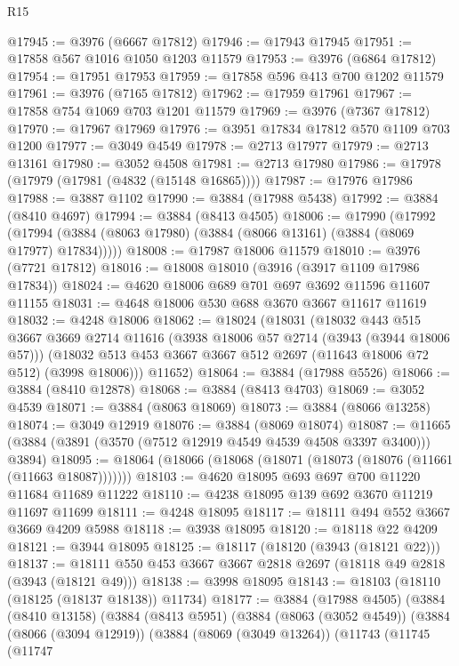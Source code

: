 \begin{lexlean}{R15}
\begin{coremodule}
@17945 := @3976 (@6667 @17812)
@17946 := @17943 @17945
@17951 := @17858 @567 @1016 @1050 @1203 @11579
@17953 := @3976 (@6864 @17812)
@17954 := @17951 @17953
@17959 := @17858 @596 @413 @700 @1202 @11579
@17961 := @3976 (@7165 @17812)
@17962 := @17959 @17961
@17967 := @17858 @754 @1069 @703 @1201 @11579
@17969 := @3976 (@7367 @17812)
@17970 := @17967 @17969
@17976 := @3951 @17834 @17812 @570 @1109 @703 @1200
@17977 := @3049 @4549
@17978 := @2713 @17977
@17979 := @2713 @13161
@17980 := @3052 @4508
@17981 := @2713 @17980
@17986 := @17978 (@17979 (@17981 (@4832 (@15148 @16865))))
@17987 := @17976 @17986
@17988 := @3887 @1102
@17990 := @3884 (@17988 @5438)
@17992 := @3884 (@8410 @4697)
@17994 := @3884 (@8413 @4505)
@18006 := @17990
    (@17992 (@17994 (@3884 (@8063 @17980) (@3884 (@8066 @13161) (@3884 (@8069 @17977) @17834)))))
@18008 := @17987 @18006 @11579
@18010 := @3976 (@7721 @17812)
@18016 := @18008 @18010 (@3916 (@3917 @1109 @17986 @17834))
@18024 := @4620 @18006 @689 @701 @697 @3692 @11596 @11607 @11155
@18031 := @4648 @18006 @530 @688 @3670 @3667 @11617 @11619
@18032 := @4248 @18006
@18062 := @18024
    (@18031
      (@18032
        @443
        @515
        @3667
        @3669
        @2714
        @11616
        (@3938 @18006 @57 @2714 (@3943 (@3944 @18006 @57)))
        (@18032 @513 @453 @3667 @3667 @512 @2697 (@11643 @18006 @72 @512) (@3998 @18006)))
      @11652)
@18064 := @3884 (@17988 @5526)
@18066 := @3884 (@8410 @12878)
@18068 := @3884 (@8413 @4703)
@18069 := @3052 @4539
@18071 := @3884 (@8063 @18069)
@18073 := @3884 (@8066 @13258)
@18074 := @3049 @12919
@18076 := @3884 (@8069 @18074)
@18087 := @11665 (@3884 (@3891 (@3570 (@7512 @12919 @4549 @4539 @4508 @3397 @3400))) @3894)
@18095 := @18064 (@18066 (@18068 (@18071 (@18073 (@18076 (@11661 (@11663 @18087)))))))
@18103 := @4620 @18095 @693 @697 @700 @11220 @11684 @11689 @11222
@18110 := @4238 @18095 @139 @692 @3670 @11219 @11697 @11699
@18111 := @4248 @18095
@18117 := @18111 @494 @552 @3667 @3669 @4209 @5988
@18118 := @3938 @18095
@18120 := @18118 @22 @4209
@18121 := @3944 @18095
@18125 := @18117 (@18120 (@3943 (@18121 @22)))
@18137 := @18111 @550 @453 @3667 @3667 @2818 @2697 (@18118 @49 @2818 (@3943 (@18121 @49)))
@18138 := @3998 @18095
@18143 := @18103 (@18110 (@18125 (@18137 @18138)) @11734)
@18177 := @3884
    (@17988 @4505)
    (@3884
      (@8410 @13158)
      (@3884
        (@8413 @5951)
        (@3884
          (@8063 (@3052 @4549))
          (@3884
            (@8066 (@3094 @12919))
            (@3884
              (@8069 (@3049 @13264))
              (@11743
                (@11745
                  (@11747

\end{coremodule}
\end{lexlean}
